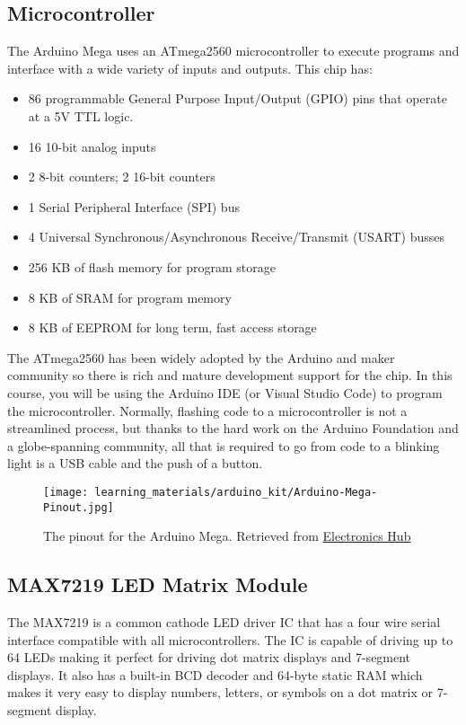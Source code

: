     \subsection*{Microcontroller}
    The Arduino Mega uses an ATmega2560 microcontroller to execute programs and interface with a wide variety of inputs and outputs.
    This chip has:
    \begin{itemize}
        \item 86 programmable General Purpose Input/Output (GPIO) pins that operate at a 5V TTL logic.
        \item 16 10-bit analog inputs
        \item 2 8-bit counters; 2 16-bit counters
        \item 1 Serial Peripheral Interface (SPI) bus
        \item 4 Universal Synchronous/Asynchronous Receive/Transmit (USART) busses
        \item 256 KB of flash memory for program storage
        \item 8 KB of SRAM for program memory
        \item 8 KB of EEPROM for long term, fast access storage
    \end{itemize}

    The ATmega2560 has been widely adopted by the Arduino and maker community so there is rich and mature development support for the chip.
    In this course, you will be using the Arduino IDE (or Visual Studio Code) to program the microcontroller. 
    Normally, flashing code to a microcontroller is not a streamlined process, but thanks to the hard work on the Arduino Foundation and a globe-spanning community, all that is required to go from code to a blinking light is a USB cable and the push of a button.

    \begin{figure*}[h!]
        \texttt{[image: learning\_materials/arduino\_kit/Arduino-Mega-Pinout.jpg]}
        \caption[Arduino Mega Pinout]{The pinout for the Arduino Mega. Retrieved from \href{https://www.electronicshub.org/wp-content/uploads/2021/01/Arduino-Mega-Pinout.jpg}{Electronics Hub}}
    \end{figure*}

    \pagebreak %
    \subsection*{MAX7219 LED Matrix Module}
    The MAX7219 is a common cathode LED driver IC that has a four wire serial interface compatible with all microcontrollers.
    The IC is capable of driving up to 64 LEDs making it perfect for driving dot matrix displays and 7-segment displays.
    It also has a built-in BCD decoder and 64-byte static RAM which makes it very easy to display numbers, letters, or symbols on a dot matrix or 7-segment display.

